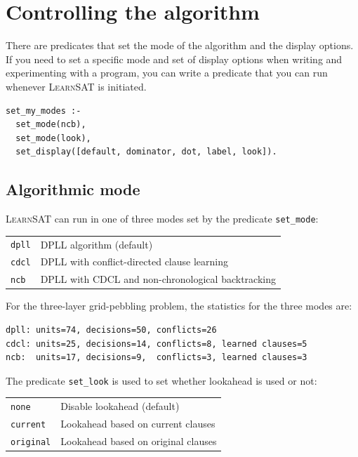 \documentclass[11pt]{article}
\newcommand*{\p}[1]{\textup{\texttt{#1}}}
\newcommand*{\ls}{\textsc{LearnSAT}}
\begin{document}
\section{Controlling the algorithm}

There are predicates that set the mode of the algorithm and the display options. If you need to set a specific mode and set of display options when writing and experimenting with a program, you can write a predicate that you can run whenever \ls{} is initiated.

\begin{verbatim}
set_my_modes :-
  set_mode(ncb), 
  set_mode(look),
  set_display([default, dominator, dot, label, look]).
\end{verbatim}

\newpage

\subsection{Algorithmic mode}

\ls{} can run in one of three modes set by the predicate \p{set\_mode}:

\begin{center}
\begin{tabular}{|l|l|}
\hline
\p{dpll} & DPLL algorithm (default)\\
\p{cdcl} & DPLL with conflict-directed clause learning\\
\p{ncb} &  DPLL with CDCL and non-chronological backtracking\\
\hline
\end{tabular}
\end{center}

For the three-layer grid-pebbling problem, the statistics for the three modes are:
\begin{verbatim}
dpll: units=74, decisions=50, conflicts=26
cdcl: units=25, decisions=14, conflicts=8, learned clauses=5
ncb:  units=17, decisions=9,  conflicts=3, learned clauses=3
\end{verbatim}

The predicate \p{set\_look} is used to set whether lookahead is used or not:
\begin{center}
\begin{tabular}{|l|l|}
\hline
\p{none} & Disable lookahead (default)\\
\p{current} & Lookahead based on current clauses\\
\p{original} & Lookahead based on original clauses\\
\hline
\end{tabular}
\end{center}
\end{document}
